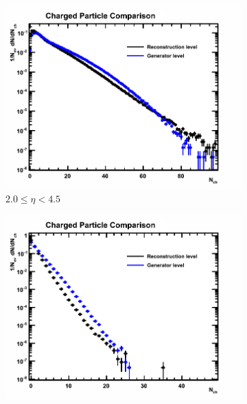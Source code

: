 
\begin{figure}[h]
	\begin{subfigure}[h]{0.32\textwidth}
		\includegraphics[width=\textwidth]{./Chapters/multiplicity/charged_particle_event_multiplicity/images/reco_gen_comparison/2_0-4_5.png}
		\caption{$2.0 \le \eta < 4.5$}
		\label{fig: reconstructed track multiplicity measured down 2.0 - 4.5}
	\end{subfigure}
	\begin{subfigure}[h]{0.32\textwidth}
		\includegraphics[width=\textwidth]{./Chapters/multiplicity/charged_particle_event_multiplicity/images/reco_gen_comparison/2_0-2_5.png}

\end{subfigure}
\end{figure}
